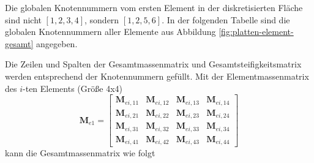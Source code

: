 \documentclass[a4paper,10pt,twoside]{article}
\numberwithin{equation}{section} %
\numberwithin{figure}{section}   %
\numberwithin{table}{section}    %
\begin{document}
	Die globalen Knotennummern vom ersten Element in der diskretisierten Fläche sind nicht $ [1,2,3,4] $, sondern $ [1,2,5,6] $. In der folgenden Tabelle sind die globalen Knotennummern aller Elemente aus Abbildung \ref{fig:platten-element-gesamt} angegeben.
	\begin{table}[H]\label{tab:knoten-Gesammt}
		\renewcommand\arraystretch{1.2}
		\centering
	    \caption{Globale Knotennummern aller Elemente aus Abbildung \ref{fig:platten-element-gesamt}.}
	\end{table}
	Die Zeilen und Spalten der Gesamtmassenmatrix und Gesamtsteifigkeitsmatrix werden entsprechend der Knotennummern gefüllt. Mit der Elementmassenmatrix des $i$-ten Elements (Größe 4x4)
    \begin{equation}\label{equ:platten-Mei}
    \mathbf{M}_{e1} = 
    \left[ 
    \begin{array}{cccc}
    \mathbf{M}_{ei,11} & \mathbf{M}_{ei,12} & \mathbf{M}_{ei,13} & \mathbf{M}_{ei,14} \\
    \mathbf{M}_{ei,21} & \mathbf{M}_{ei,22} & \mathbf{M}_{ei,23} & \mathbf{M}_{ei,24} \\
    \mathbf{M}_{ei,31} & \mathbf{M}_{ei,32} & \mathbf{M}_{ei,33} & \mathbf{M}_{ei,34} \\
    \mathbf{M}_{ei,41} & \mathbf{M}_{ei,42} & \mathbf{M}_{ei,43} & \mathbf{M}_{ei,44}
    \end{array}
    \right] 
    \end{equation}
    kann die Gesamtmassenmatrix wie folgt
\end{document}
